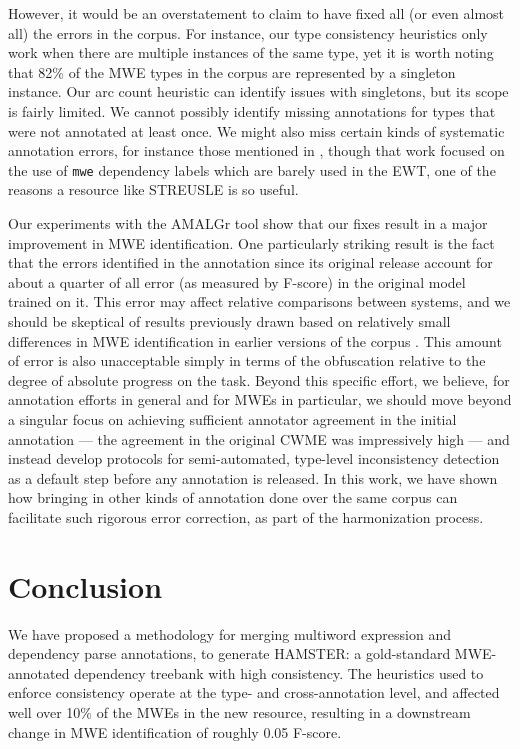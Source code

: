 \documentclass[output=paper
,modfonts
,nonflat]{langsci/langscibook}
\newcommand{\mwetype}[1]{\texttt{#1}\xspace}
\begin{document}
However, it would be an overstatement to claim to have fixed all (or even almost all) the errors in the corpus. For instance, our type consistency heuristics only work when there are multiple instances of the same type, yet it is worth noting that 82\% of the MWE types in the corpus are represented by a singleton instance. Our arc count heuristic can identify issues with singletons, but its scope is fairly limited. We cannot possibly identify missing annotations for types that were not annotated at least once. We might also miss certain kinds of systematic annotation errors, for instance those mentioned in \citet{de2015studying}, though that work focused on the use of \mwetype{mwe} dependency labels which are barely used in the EWT, one of the reasons a resource like STREUSLE is so useful.

Our experiments with the AMALGr tool show that our fixes result in a major improvement in MWE identification. One particularly striking result is the fact that the errors identified in the annotation since its original release account for about a quarter of all error (as measured by F-score) in the original model trained on it. This error may affect relative comparisons between systems, and we should be skeptical of results previously drawn based on relatively small differences in MWE identification in earlier versions of the corpus \citet{Qu+:2015a}. This amount of error is also unacceptable simply in terms of the obfuscation relative to the degree of absolute progress on the task. Beyond this specific effort, we believe, for annotation efforts in general and for MWEs in particular, we should move beyond a singular focus on achieving sufficient annotator agreement in the initial annotation --- the agreement in the original CWME was impressively high --- and instead develop protocols for semi-automated, type-level inconsistency detection as a default step before any annotation is released. In this work, we have shown how bringing in other kinds of annotation done over the same corpus can facilitate such rigorous error correction, as part of the harmonization process.


\section{Conclusion}

We have proposed a methodology for merging multiword expression and dependency parse annotations, to generate HAMSTER: a gold-standard MWE-annotated dependency treebank with high consistency. The heuristics used to enforce consistency operate at the type- and cross-annotation level, and affected well over 10\% of the MWEs in the new resource, resulting in a downstream change in MWE identification of roughly 0.05 F-score.

%
%

{\sloppy
\printbibliography[heading=subbibliography,notkeyword=this]
}
\end{document}
